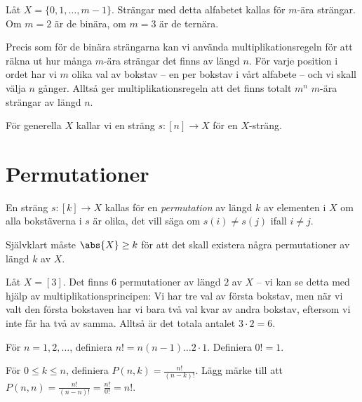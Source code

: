 \documentclass{tufte-handout}
\begin{document}
\begin{example}
	Låt $X = \{0,1,\ldots,m-1\}$. Strängar med detta alfabetet kallas för $m$-ära strängar. Om $m = 2$ är de binära, om $m = 3$ är de ternära.
	
	Precis som för de binära strängarna kan vi använda multiplikationsregeln för att räkna ut hur många $m$-ära strängar det finns av längd $n$. För varje position i ordet har vi $m$ olika val av bokstav -- en per bokstav i vårt alfabete -- och vi skall välja $n$ gånger. Alltså ger multiplikationsregeln att det finns totalt $m^n$ $m$-ära strängar av längd $n$. 
\end{example}

För generella $X$ kallar vi en sträng $s: [n] \to X$ för en $X$-sträng.

\section{Permutationer}

\begin{definition}
	En sträng $s: [k] \to X$ kallas för en \emph{permutation} av längd $k$ av elementen i $X$ om alla bokstäverna i $s$ är olika, det vill säga om $s(i) \neq s(j)$ ifall $i \neq j$.
\end{definition}

Självklart måste $\abs{X} \geq k$ för att det skall existera några permutationer av längd $k$ av $X$.

\begin{example}
	Låt $X = [3]$. Det finns $6$ permutationer av längd $2$ av $X$ -- vi kan se detta med hjälp av multiplikationsprincipen: Vi har tre val av första bokstav, men när vi valt den första bokstaven har vi bara två val kvar av andra bokstav, eftersom vi inte får ha två av samma. Alltså är det totala antalet $3\cdot 2 = 6$.
\end{example}

\begin{definition}
	För $n = 1, 2,\ldots$, definiera $n! = n(n-1)\ldots2\cdot1$. Definiera $0! = 1$.

	För $0 \leq k \leq n$, definiera $P(n,k) = \frac{n!}{(n-k)!}$. Lägg märke till att $P(n,n) = \frac{n!}{(n-n)!} = \frac{n!}{0!} = n!$.
\end{definition}
\end{document}
